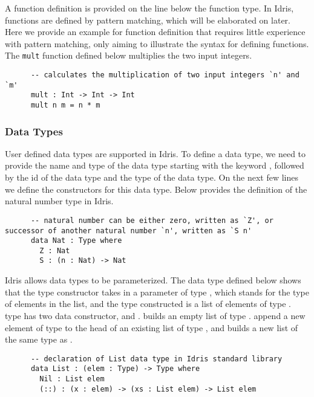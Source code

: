 A function definition is provided on the line below the function type. In Idris, functions are defined by pattern matching, which will be elaborated on later. Here we provide an example for function definition that requires little experience with pattern matching, only aiming to illustrate the syntax for defining functions. The \texttt{mult} function defined below multiplies the two input integers. 
\begin{lstlisting}
      -- calculates the multiplication of two input integers `n' and `m'
      mult : Int -> Int -> Int
      mult n m = n * m
\end{lstlisting}

\subsubsection*{Data Types}
User defined data types are supported in Idris. To define a data type, we need to provide the name and type of the data type starting with the keyword , followed by the id of the data type and the type of the data type. On the next few lines we define the constructors for this data type. Below provides the definition of the natural number type  in Idris. 
\begin{lstlisting}
      -- natural number can be either zero, written as `Z', or successor of another natural number `n', written as `S n'
      data Nat : Type where
        Z : Nat
        S : (n : Nat) -> Nat 
\end{lstlisting}

Idris allows data types to be parameterized. The data type defined below shows that the type constructor  takes in a parameter  of type , which stands for the type of elements in the list, and the type constructed is a list of elements of type .  type has two data constructor,  and \inl{(::)}.  builds an empty list of type . \inl{(::)} append a new element  of type  to the head of an existing list  of type , and builds a new list  of the same type as . 
 \begin{lstlisting}
      -- declaration of List data type in Idris standard library
      data List : (elem : Type) -> Type where
        Nil : List elem
        (::) : (x : elem) -> (xs : List elem) -> List elem
\end{lstlisting}


